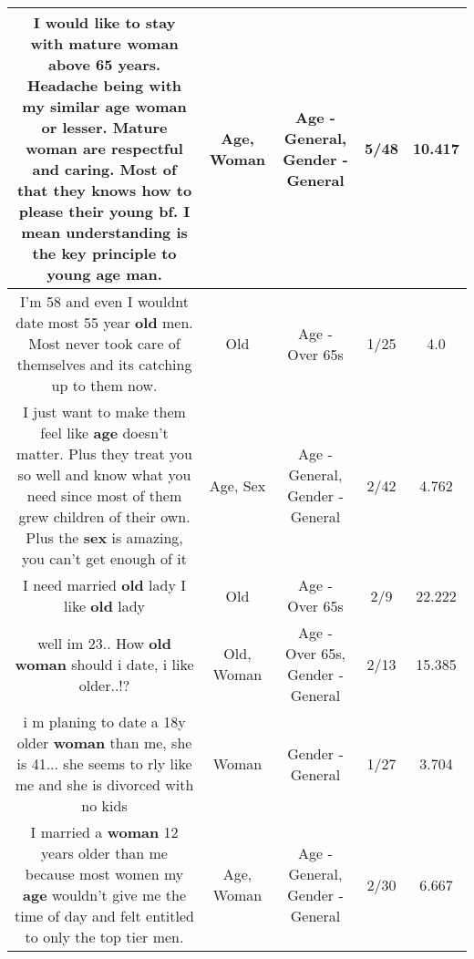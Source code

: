 \documentclass[11pt]{article}
\newlength\mylength
\begin{document}
\begin{center}
\begin{longtable}{|C{.65\mylength}|C{.30\mylength}|C{.12\mylength}|C{.12\mylength}|C{.12\mylength}|}
  \small I would like to stay with mature \textbf{woman} above 65 years. Headache being with my similar \textbf{age} \textbf{woman} or lesser. Mature \textbf{woman} are respectful and caring. Most of that they knows how to please their young bf. I mean understanding is the key principle to young \textbf{age} man.\normalsize   & Age, Woman & Age - General, Gender - General & 5/48 & 10.417 \\  \hline
  \small I'm 58 and even I wouldnt date most 55 year \textbf{old} men. Most never took care of themselves and its catching up to them now.\normalsize   & Old & Age - Over 65s & 1/25 & 4.0 \\  \hline
  \small I just want to make them feel like \textbf{age} doesn't matter. Plus they treat you so well and know what you need since most of them grew children of their own. Plus the \textbf{sex} is amazing, you can't get enough of it\normalsize   & Age, Sex & Age - General, Gender - General & 2/42 & 4.762 \\  \hline
  \small I need married \textbf{old} lady I like \textbf{old} lady\normalsize   & Old & Age - Over 65s & 2/9 & 22.222 \\  \hline
  \small well im 23.. How \textbf{old} \textbf{woman} should i date, i like older..!?\normalsize   & Old, Woman & Age - Over 65s, Gender - General & 2/13 & 15.385 \\  \hline
  \small i m planing to date a 18y older \textbf{woman} than me, she is 41... she seems to rly like me and she is divorced with no kids\normalsize   & Woman & Gender - General & 1/27 & 3.704 \\  \hline
  \small I married a \textbf{woman} 12 years older than me because most women my \textbf{age} wouldn't give me the time of day and felt entitled to only the top tier men.\normalsize   & Age, Woman & Age - General, Gender - General & 2/30 & 6.667 \\  \hline

\end{longtable}
\end{center}
\end{document}
